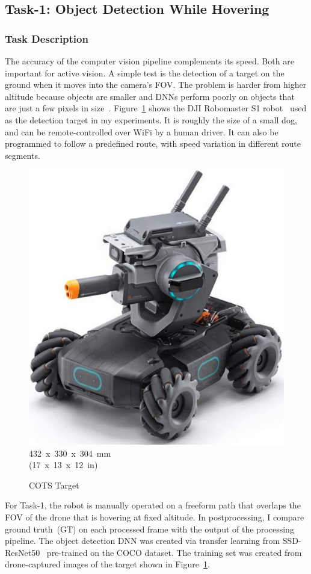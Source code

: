 \subsection{Task-1: Object Detection While Hovering}
\label{sec:task1}

\subsubsection{Task Description}
\label{sec:task1-desc}

The accuracy of the computer vision pipeline complements its speed.
\begingroup
\setlength{\columnsep}{4pt}
Both are important for active vision.  A simple test is the detection
of a target on the ground when it moves into the camera's FOV.  The
problem is harder from higher altitude because objects are smaller and
DNNs perform poorly on objects that are just a few pixels in
size~\cite{Huang2017}.
Figure~\ref{fig:robomaster} shows the DJI Robomaster S1
robot~\cite{Robomaster2022} used as the detection target in my
experiments.  It is roughly the size of a small dog, and can be
remote-controlled over WiFi by a human driver.  It can also be
programmed to follow a predefined route, with speed variation in
different route segments. 

\begin{figure}
\centering
\includegraphics[width=0.4\linewidth]{chapter4/FIGS/robomaster.jpg}\\
{\footnotesize 432~x~330~x~304~mm\\[-0.05in]
\noindent(17~x~13~x~12~in)}
\caption{COTS Target}
\label{fig:robomaster}
\end{figure}

For Task-1, the robot is manually operated
on a freeform path that overlaps the FOV of the drone that is hovering
at fixed altitude.  In postprocessing, I compare ground truth~(GT) on
each processed frame with the output of the processing pipeline.  The
object detection DNN was created via transfer learning from
SSD-ResNet50~\cite{SSDResnet50} pre-trained on the COCO dataset.  The
training set was created from drone-captured images of the target
shown in Figure~\ref{fig:robomaster}.

